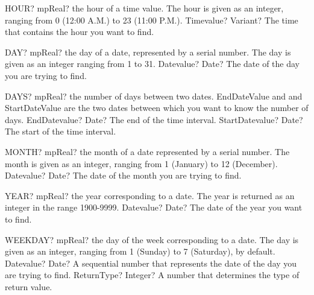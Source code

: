 \documentclass[12pt,a4paper,openany]{book}
\begin{document}
\begin{mpFunctionsExtract}
\mpWorksheetFunctionOneNotImplemented
{HOUR? mpReal? the hour of a time value. The hour is given as an integer, ranging from 0 (12:00 A.M.) to 23 (11:00 P.M.).}
{Timevalue? Variant? The time that contains the hour you want to find.}
\end{mpFunctionsExtract}

\begin{mpFunctionsExtract}
\mpWorksheetFunctionOneNotImplemented
{DAY? mpReal? the day of a date, represented by a serial number. The day is given as an integer ranging from 1 to 31.}
{Datevalue? Date? The date of the day you are trying to find.}
\end{mpFunctionsExtract}

\begin{mpFunctionsExtract}
\mpWorksheetFunctionTwoNotImplemented
{DAYS? mpReal? the number of days between two dates. EndDateValue and  and StartDateValue  are the two dates between which you want to know the number of days.}
{EndDatevalue? Date? The end of the time interval.}
{StartDatevalue? Date? The start of the time interval.}
\end{mpFunctionsExtract}

\begin{mpFunctionsExtract}
\mpWorksheetFunctionOneNotImplemented
{MONTH? mpReal? the month of a date represented by a serial number. The month is given as an integer, ranging from 1 (January) to 12 (December).}
{Datevalue? Date? The date of the month you are trying to find.}
\end{mpFunctionsExtract}

\begin{mpFunctionsExtract}
\mpWorksheetFunctionOneNotImplemented
{YEAR? mpReal? the year corresponding to a date. The year is returned as an integer in the range 1900-9999.}
{Datevalue? Date? The date of the year you want to find.}
\end{mpFunctionsExtract}

\begin{mpFunctionsExtract}
\mpWorksheetFunctionTwoNotImplemented
{WEEKDAY? mpReal? the day of the week corresponding to a date. The day is given as an integer, ranging from 1 (Sunday) to 7 (Saturday), by default.}
{Datevalue? Date? A sequential number that represents the date of the day you are trying to find.}
{ReturnType? Integer? A number that determines the type of return value.}
\end{mpFunctionsExtract}
\end{document}
